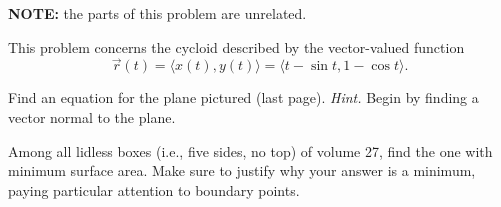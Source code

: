 \begin{questions}
    \question[16] \textbf{NOTE:} the parts of this problem are unrelated.

    \question This problem concerns the cycloid described by the vector-valued function
    \[
        \vec{r}(t) = \langle x(t), y(t) \rangle = \langle t - \sin t, 1 - \cos t \rangle.
    \]


    \question[16] \label{prob:planepic}
        Find an equation for the plane pictured (last page). \emph{Hint.} Begin by finding a vector normal to the plane.
        
   \question[16]
        Among all lidless boxes (i.e., five sides, no top) of volume 27, find the one with minimum surface area. Make sure to justify why your answer is a minimum, paying particular attention to boundary points.


\end{questions}
